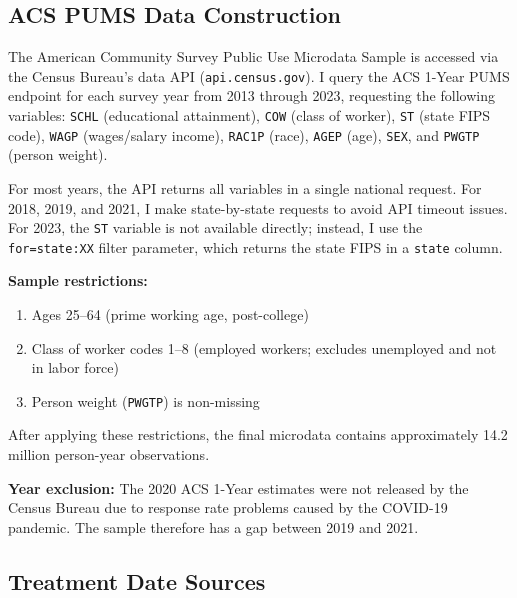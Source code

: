 \documentclass[12pt]{article}
\begin{document}
\subsection{ACS PUMS Data Construction}

The American Community Survey Public Use Microdata Sample is accessed via the Census Bureau's data API (\texttt{api.census.gov}). I query the ACS 1-Year PUMS endpoint for each survey year from 2013 through 2023, requesting the following variables: \texttt{SCHL} (educational attainment), \texttt{COW} (class of worker), \texttt{ST} (state FIPS code), \texttt{WAGP} (wages/salary income), \texttt{RAC1P} (race), \texttt{AGEP} (age), \texttt{SEX}, and \texttt{PWGTP} (person weight).

For most years, the API returns all variables in a single national request. For 2018, 2019, and 2021, I make state-by-state requests to avoid API timeout issues. For 2023, the \texttt{ST} variable is not available directly; instead, I use the \texttt{for=state:XX} filter parameter, which returns the state FIPS in a \texttt{state} column.

\textbf{Sample restrictions:}
\begin{enumerate}
\item Ages 25--64 (prime working age, post-college)
\item Class of worker codes 1--8 (employed workers; excludes unemployed and not in labor force)
\item Person weight (\texttt{PWGTP}) is non-missing
\end{enumerate}

After applying these restrictions, the final microdata contains approximately 14.2 million person-year observations.

\textbf{Year exclusion:} The 2020 ACS 1-Year estimates were not released by the Census Bureau due to response rate problems caused by the COVID-19 pandemic. The sample therefore has a gap between 2019 and 2021.

\subsection{Treatment Date Sources}
\end{document}
